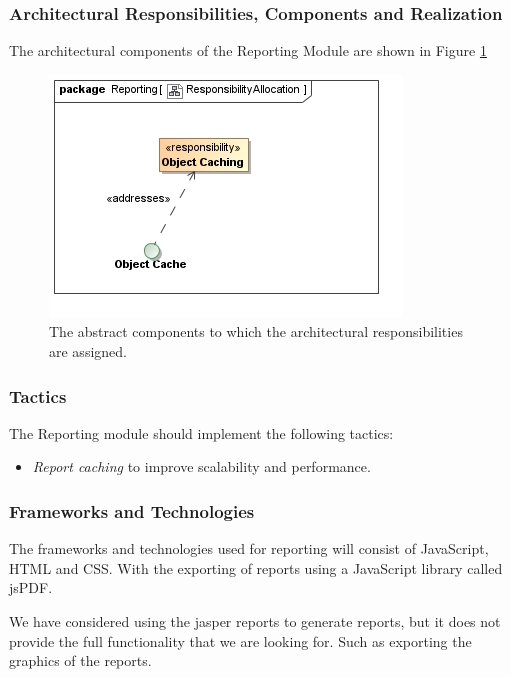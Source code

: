 \subsubsection{Architectural Responsibilities, Components and Realization}
The architectural components of the Reporting Module are shown in Figure \ref{fig:reportingResponsibilityAllocation}
\begin{figure}[H]
	\begin{center}
	\includegraphics[scale=0.5]{../Diagrams and Charts/Reporting/ResponsibilityAllocation.jpg}
	\caption{The abstract components to which the architectural responsibilities are assigned.}
	\label{fig:reportingResponsibilityAllocation}
	\end{center}
\end{figure}



\subsubsection{Tactics}
The Reporting module should implement the following tactics:
\begin{itemize}
  \item \textit{Report caching} to improve scalability and performance.
\end{itemize}



\subsubsection{Frameworks and Technologies}
The frameworks and technologies used for reporting will consist of JavaScript,
HTML and CSS. With the exporting of reports using a JavaScript library called jsPDF.

We have considered using the jasper reports to generate reports, but it does
 not provide the full functionality that we are looking for. Such as exporting the graphics of the reports.
